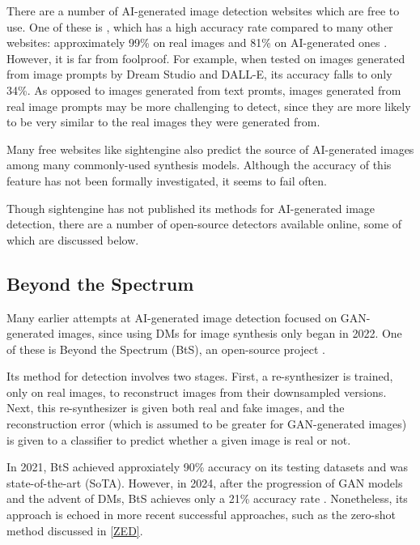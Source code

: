 \documentclass{article} %
\begin{document}
There are a number of AI-generated image detection websites which are free to use. One of these is \citet{sightengine}, which has a high accuracy rate compared to many other websites: approximately 99\% on real images and 81\% on AI-generated ones \citep{li2024adversarialaiartunderstandinggeneration}. However, it is far from foolproof. For example, when tested on images generated from image prompts by Dream Studio and DALL-E, its accuracy falls to only 34\%. As opposed to images generated from text promts, images generated from real image prompts may be more challenging to detect, since they are more likely to be very similar to the real images they were generated from.

Many free websites like sightengine also predict the source of AI-generated images among many commonly-used synthesis models. Although the accuracy of this feature has not been formally investigated, it seems to fail often.

Though sightengine has not published its methods for AI-generated image detection, there are a number of open-source detectors available online, some of which are discussed below.

\subsection{Beyond the Spectrum}

Many earlier attempts at AI-generated image detection focused on GAN-generated images, since using DMs for image synthesis only began in 2022. One of these is Beyond the Spectrum (BtS), an open-source project \citep{he2021spectrumdetectingdeepfakesresynthesis}.

Its method for detection involves two stages. First, a re-synthesizer is trained, only on real images, to reconstruct images from their downsampled versions. Next, this re-synthesizer is given both real and fake images, and the reconstruction error (which is assumed to be greater for GAN-generated images) is given to a classifier to predict whether a given image is real or not.

In 2021, BtS achieved approxiately 90\% accuracy on its testing datasets and was state-of-the-art (SoTA). However, in 2024, after the progression of GAN models and the advent of DMs, BtS achieves only a 21\% accuracy rate \citep{li2024adversarialaiartunderstandinggeneration}. Nonetheless, its approach is echoed in more recent successful approaches, such as the zero-shot method discussed in \ref{ZED}.
\end{document}
